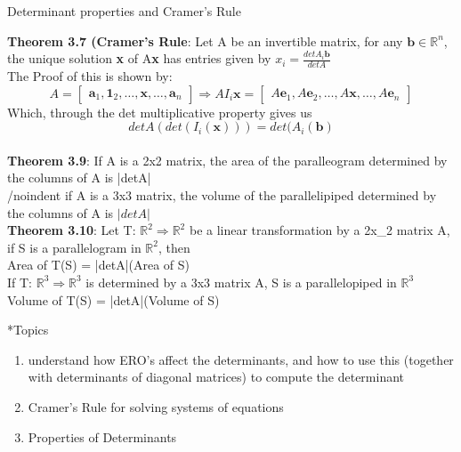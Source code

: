 \documentclass[a4paper, 12pt]{article}
\begin{document}
\begin{section}{Determinant properties and Cramer's Rule}
\begin{subsection}
\noindent\textbf{Theorem 3.7 (Cramer's Rule}: Let A be an invertible 
matrix, for any $\textbf{b}\in\mathbb{R}^{n}$, the unique solution
\textbf{x} of A\textbf{x} has entries given by $x_{i}=\frac{detA_{i}
\textbf{b}}{detA}$\\
The Proof of this is shown by:
\begin{equation}
A=\begin{bmatrix} \textbf{a}_{1}, \textbf{1}_{2},\dots,\textbf{x},
\dots, \textbf{a}_{n} \end{bmatrix} \Rightarrow AI_{i}\textbf{x}=
\begin{bmatrix} A\textbf{e}_{1},A\textbf{e}_{2},\dots,A\textbf{x} 
,\dots,A\textbf{e}_{n} \end{bmatrix} 
\end{equation} Which, through the det multiplicative property gives us
\begin{equation}
	detA(det(I_{i}(\textbf{x})))=det(A_{i}(\textbf{b})
\end{equation} \\
\noindent\textbf{Theorem 3.9}: If A is a 2x2 matrix, the area of the
paralleogram determined by the columns of A is |detA| \\
/noindent if A is a 3x3 matrix, the volume of the parallelipiped determined
by the columns of A is $\lvert detA\rvert$ 
\\
\noindent\textbf{Theorem 3.10}: Let T: $\mathbb{R}^{2}\Rightarrow
\mathbb{R}^{2}$ be a linear transformation by a 2x_2 matrix A, if S is a 
parallelogram in $\mathbb{R}^{2}$, then\\
Area of T(S) = |detA|(Area of S)\\
If T: $\mathbb{R}^{3}\Rightarrow \mathbb{R}^{3}$ is determined by a 3x3
matrix A, S is a parallelopiped in $\mathbb{R}^{3}$\\
Volume of T(S) = |detA|(Volume of S)
\end{subsection}
\begin{subsection}*{Topics}
\begin{enumerate}
\item{understand how ERO's affect the determinants, and how to 
use this (together with determinants of diagonal matrices) 
to compute the determinant}
\item{Cramer's Rule for solving systems of equations}
\item{Properties of Determinants}
\end{enumerate}
\end{subsection}
\end{section}
\end{document}
